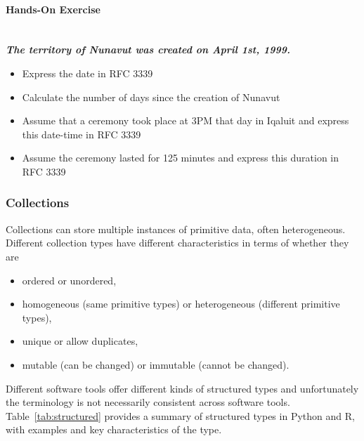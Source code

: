 \begin{tcolorbox}[colback=code]
\paragraph*{Hands-On Exercise} 

\textit{\textbf{\vspace{3mm} \\The territory of Nunavut was created on April 1st, 1999. \vspace{3mm}}}

\begin{itemize}
	\item Express the date in RFC 3339
	\item Calculate the number of days since the creation of Nunavut
	\item Assume that a ceremony took place at 3PM that day in Iqaluit and express this date-time in RFC 3339
	\item Assume the ceremony lasted for 125 minutes and express this duration in RFC 3339
\end{itemize}
\end{tcolorbox}

\subsubsection*{Collections}

Collections can store multiple instances of primitive data, often heterogeneous. Different collection types have different characteristics in terms of whether they are 

\begin{itemize}
\item ordered or unordered, 
\item homogeneous (same primitive types) or heterogeneous (different primitive types), 
\item unique or allow duplicates, 
\item mutable (can be changed) or immutable (cannot be changed). 
\end{itemize}

Different software tools offer different kinds of structured types and unfortunately the terminology is not necessarily consistent across software tools. Table~\ref{tab:structured} provides a summary of structured types in Python and R, with examples and key characteristics of the type.

